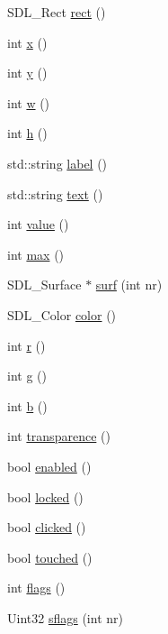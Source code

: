 \begin{DoxyCompactItemize}
S\+D\+L\+\_\+\+Rect \hyperlink{classsanform_a8980c16634b425d2633ef13d5efaf3ea}{rect} ()
\item 
int \hyperlink{classsanform_a54ddb806c6e057f175011c3ce2f248c4}{x} ()
\item 
int \hyperlink{classsanform_ac4c19cd83b02fa1329c2f00b2b90c053}{y} ()
\item 
int \hyperlink{classsanform_a1e5e32694d8163d467041b2c255ebeb3}{w} ()
\item 
int \hyperlink{classsanform_aaeb84bc2c6186f3d8ae4a6320e713d36}{h} ()
\item 
std\+::string \hyperlink{classsanform_a64996966d86b8bfe9dbb40d98be4f33e}{label} ()
\item 
std\+::string \hyperlink{classsanform_a50df161c158a58f3b856d6ba3f15cd1e}{text} ()
\item 
int \hyperlink{classsanform_a04e2d6f2772df4ab31db99ea53f579f6}{value} ()
\item 
int \hyperlink{classsanform_a347c99fa3be866e0c9c53c58a3f7f33f}{max} ()
\item 
S\+D\+L\+\_\+\+Surface $\ast$ \hyperlink{classsanform_aa6dd520ab39b8df5b0471e4da91ec7b1}{surf} (int nr)
\item 
S\+D\+L\+\_\+\+Color \hyperlink{classsanform_a1e9df16c7e317690516723609be1ef5d}{color} ()
\item 
int \hyperlink{classsanform_aef4f3882573a6f68f70dbfacf5279a2c}{r} ()
\item 
int \hyperlink{classsanform_a1383ff34c3616bbd8c7f3200f6b64253}{g} ()
\item 
int \hyperlink{classsanform_ab099c8fa7ad28e1972a03bf9a974dec2}{b} ()
\item 
int \hyperlink{classsanform_a0db77c92819b04a36664c3a05f62ee1c}{transparence} ()
\item 
bool \hyperlink{classsanform_a312165dae81679c80cc5cf3079525027}{enabled} ()
\item 
bool \hyperlink{classsanform_aea6a94c5f0a2dc5a6bafccd5e4a2083b}{locked} ()
\item 
bool \hyperlink{classsanform_af77194b6218f8ff9b114b761dfe01830}{clicked} ()
\item 
bool \hyperlink{classsanform_a8eecf2e58806d0ea0e69702ae47b7db2}{touched} ()
\item 
int \hyperlink{classsanform_aea89aa70ab4d15c9d657891e5e47b9da}{flags} ()
\item 
Uint32 \hyperlink{classsanform_a6249169360c695e1584c41f2dd4584e7}{sflags} (int nr)
\item 

\end{DoxyCompactItemize}

